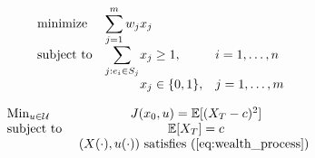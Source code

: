 \documentclass[11pt]{book}
\begin{document}
\begin{equation*}
\begin{array}{ll@{}ll}
\text{minimize}  & \displaystyle\sum\limits_{j=1}^{m} w_{j}&x_{j} &\\
\text{subject to}& \displaystyle\sum\limits_{j:e_{i} \in S_{j}}   &x_{j} \geq 1,  &i=1 ,\dots, n\\
                 &                                                &x_{j} \in \{0,1\}, &j=1 ,\dots, m
\end{array}
\end{equation*}


\begin{equation*}
\label{problem_of_portfolio}
\begin{array}{lc}
\operatorname*{Min}_{ u \in  \mathcal U }  & J(x_0, u) = \mathbb E [ ( X_T - c )^2 ]          \\
\text{subject to }   & \mathbb E [ X_T ] = c                             \\
                     & (X(\cdot), u(\cdot)) \text{ satisfies (\ref{eq:wealth_process})   }
\end{array}
\end{equation*}
\end{document}
